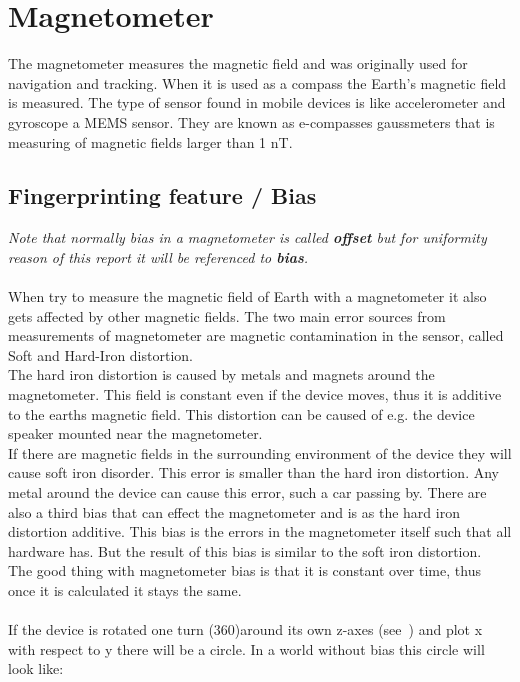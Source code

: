 \section{Magnetometer}
The magnetometer measures the magnetic field and was originally used for navigation and tracking. When it is used as a compass the Earth's magnetic field is measured. The type of sensor found in mobile devices is like accelerometer and gyroscope a MEMS sensor. They are known as e-compasses gaussmeters that is measuring of magnetic fields larger than 1 nT.
~\cite[]{sensor:magn}

\subsection{Fingerprinting feature / Bias}
\textit{Note that normally bias in a magnetometer is called \textbf{offset} but for uniformity reason of this report it will be referenced to \textbf{bias}.}\\
\\
When try to measure the magnetic field of Earth with a magnetometer it also gets affected by other magnetic fields. The two main error sources from measurements of magnetometer are magnetic contamination in the sensor, called Soft and Hard-Iron distortion. \\
The hard iron distortion is caused by metals and magnets around the magnetometer. This field is constant even if the device moves, thus it is additive to the earths magnetic field. This distortion can be caused of e.g. the device speaker mounted near the magnetometer. \\
If there are magnetic fields in the surrounding environment of the device they will cause soft iron disorder. This error is smaller than the hard iron distortion. Any metal around the device can cause this error, such a car passing by.
There are also a third bias that can effect the magnetometer and is as the hard iron distortion additive. This bias is the errors in the magnetometer itself such that all hardware has. But the result of this bias is similar to the soft iron distortion.  \\
The good thing with magnetometer bias is that it is constant over time, thus once it is calculated it stays the same. \\
\\
If the device is rotated one turn (360\degree)around its own z-axes (see~) and plot x with respect to y there will be a circle. In a world without bias this circle will look like:
